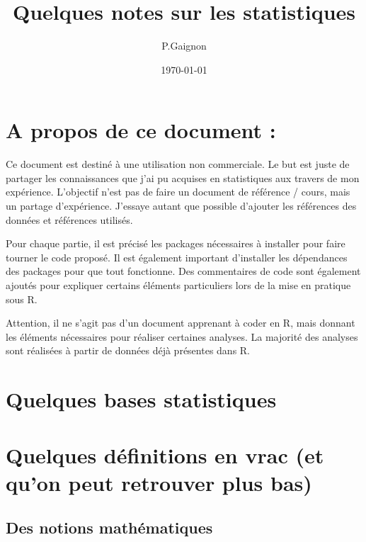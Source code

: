 \documentclass[
]{article}
\title{Quelques notes sur les statistiques}
\author{P.Gaignon}
\date{\today}
\begin{document}
\maketitle

{
\setcounter{tocdepth}{4}
\tableofcontents
}
\pagebreak

\listoffigures

\section*{A propos de ce document :}

Ce document est destiné à une utilisation non commerciale. Le but est
juste de partager les connaissances que j'ai pu acquises en statistiques
aux travers de mon expérience. L'objectif n'est pas de faire un document
de référence / cours, mais un partage d'expérience. J'essaye autant que
possible d'ajouter les références des données et références utilisés.

Pour chaque partie, il est précisé les packages nécessaires à installer
pour faire tourner le code proposé. Il est également important
d'installer les dépendances des packages pour que tout fonctionne. Des
commentaires de code sont également ajoutés pour expliquer certains
éléments particuliers lors de la mise en pratique sous R.

Attention, il ne s'agit pas d'un document apprenant à coder en R, mais
donnant les éléments nécessaires pour réaliser certaines analyses. La
majorité des analyses sont réalisées à partir de données déjà présentes
dans R.

\pagebreak

\hypertarget{quelques-bases-statistiques}{%
\section{Quelques bases
statistiques}\label{quelques-bases-statistiques}}

\hypertarget{quelques-duxe9finitions-en-vrac-et-quon-peut-retrouver-plus-bas}{%
\section{Quelques définitions en vrac (et qu'on peut retrouver plus
bas)}\label{quelques-duxe9finitions-en-vrac-et-quon-peut-retrouver-plus-bas}}

\hypertarget{des-notions-mathuxe9matiques}{%
\subsection{Des notions
mathématiques}\label{des-notions-mathuxe9matiques}}
\end{document}
